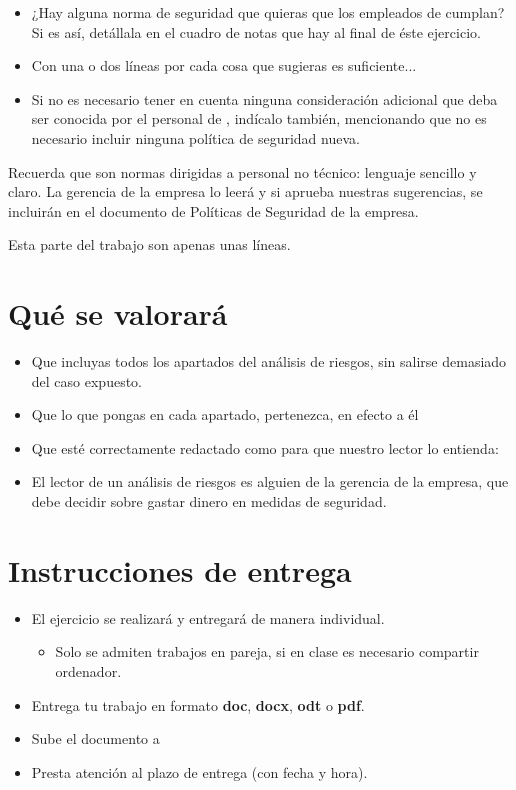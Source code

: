 \begin{itemize}
\item ¿Hay alguna norma de seguridad que quieras que los empleados de {\nombreempresa} cumplan? Si es así, detállala en  el cuadro de notas que hay al final de éste ejercicio.
  
\item Con una o dos líneas por cada cosa que sugieras es   suficiente...
  
\item Si no es necesario tener en cuenta ninguna consideración adicional que deba ser conocida por el personal  de {\nombreempresa}, indícalo también, mencionando que no es necesario incluir ninguna política de seguridad nueva.
\end{itemize}
Recuerda que son normas dirigidas a personal no técnico: lenguaje sencillo y claro. La gerencia de la empresa lo leerá y si aprueba nuestras sugerencias, se incluirán en el documento de Políticas de Seguridad de la empresa.

Esta parte del trabajo son apenas unas líneas.

\section{Qué se valorará}
\begin{itemize}
\item Que incluyas todos los apartados del análisis de riesgos, sin salirse demasiado del caso expuesto.
\item Que lo que pongas en cada apartado, pertenezca, en efecto a él
\item Que esté correctamente redactado como para que nuestro lector lo entienda:
\item El lector de un análisis de riesgos es alguien de la gerencia de la empresa, que debe decidir sobre gastar dinero en medidas de seguridad.
\end{itemize}

\section{Instrucciones de entrega}
\begin{itemize}
\item El ejercicio se realizará y entregará de manera individual.
  \begin{itemize}
  \item Solo se admiten trabajos en pareja, si en clase es necesario compartir ordenador.
  \end{itemize}
\item Entrega tu trabajo en formato \textbf{doc}, \textbf{docx}, \textbf{odt} o \textbf{pdf}.
\item Sube el documento a 
\item Presta atención al plazo de entrega (con fecha y hora).
\end{itemize}

